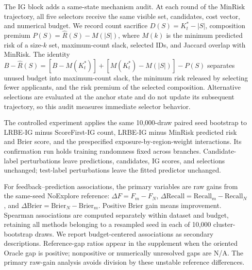 The IG block adds a same-state mechanism audit. At each round of the MinRisk trajectory, all five selectors receive the same visible set, candidates, cost vector, and numerical budget. We record count sacrifice $D(S)=K_t^*-|S|$, composition premium $P(S)=\widehat R(S)-M(|S|)$, where $M(k)$ is the minimum predicted risk of a size-$k$ set, maximum-count slack, selected IDs, and Jaccard overlap with MinRisk. The identity $B-\widehat R(S)=[B-M(K_t^*)]+[M(K_t^*)-M(|S|)]-P(S)$ separates unused budget into maximum-count slack, the minimum risk released by selecting fewer applicants, and the risk premium of the selected composition. Alternative selections are evaluated at the anchor state and do not update its subsequent trajectory, so this audit measures immediate selector behavior.

The controlled experiment applies the same 10,000-draw paired seed bootstrap to LRBE-IG minus ScoreFirst-IG count, LRBE-IG minus MinRisk predicted risk and Brier score, and the prespecified exposure-by-region-weight interactions. Its confirmation run holds training randomness fixed across branches. Candidate-label perturbations leave predictions, candidates, IG scores, and selections unchanged; test-label perturbations leave the fitted predictor unchanged.

For feedback--prediction associations, the primary variables are raw gains from the same-seed NoExplore reference: $\Delta F=F_m-F_N$, $\Delta\mathrm{Recall}=\mathrm{Recall}_m-\mathrm{Recall}_N$, and $\Delta\mathrm{Brier}=\mathrm{Brier}_N-\mathrm{Brier}_m$. Positive Brier gain means improvement. Spearman associations are computed separately within dataset and budget, retaining all methods belonging to a resampled seed in each of 10,000 cluster-bootstrap draws. We report budget-centered associations as secondary descriptions. Reference-gap ratios appear in the supplement when the oriented Oracle gap is positive; nonpositive or numerically unresolved gaps are N/A. The primary raw-gain analysis avoids division by these unstable reference differences.
